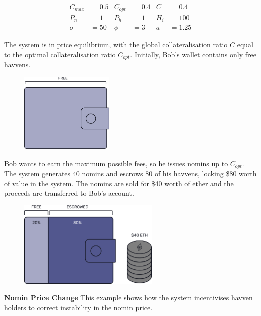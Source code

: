 \begin{align*}
C_{max} &= 0.5 & C_{opt} &= 0.4 & C &= 0.4 \\
P_n &= 1 & P_h &= 1 & H_i &= 100 \\
\sigma &= 50 & \phi &= 3 & a&= 1.25
\end{align*}

\noindent The system is in price equilibrium, with the global collateralisation ratio $C$ equal to the optimal collateralisation ratio $C_{opt}$. Initially,  Bob's wallet contains only free havvens.

\begin{figure}[h!]
\centering
    \includegraphics[width=0.40\textwidth]{img/wallet}
\end{figure}

\noindent Bob wants to earn the maximum possible fees, so he issues nomins up to $C_{opt}$. The system generates 40 nomins and escrows 80 of his havvens, locking \$80 worth of value in the system. The nomins are sold for \$40 worth of ether and the proceeds are transferred to Bob's account.
\begin{figure}[h!]
\centering
    \includegraphics[width=0.6\textwidth]{img/escrowed}
\end{figure}

\noindent \textbf{Nomin Price Change} This example shows how the system incentivises havven holders to correct instability in the nomin price.

